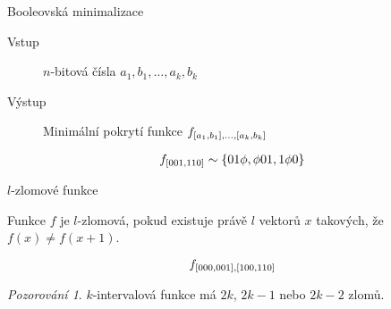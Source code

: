 \documentclass{beamer}
\theoremstyle{remark}
\newtheorem{observation}{Pozorování}
\begin{document}
\begin{frame}{Booleovská minimalizace}

\begin{problem}
\begin{description}
\item[Vstup]
$n$-bitová čísla
$a_1, b_1, \ldots, a_k, b_k$

\item[Výstup]
Minimální pokrytí funkce $f_{[a_1, b_1], \ldots, [a_k, b_k]}$
\end{description}
\end{problem}

\begin{example}
$$
f_{[001, 110]} \sim \{01 \phi, \phi 01, 1 \phi 0\}
$$

\begin{figure}[h]
\centering

\end{figure}
\end{example}
\end{frame}

\begin{frame}{$l$-zlomové funkce}
\begin{definition}
Funkce $f$ je $l$-zlomová,
pokud existuje právě $l$ vektorů $x$ takových,
že $f(x) \neq f(x+1)$.
\end{definition}

\begin{example}
$$f_{[000, 001], [100, 110]}$$

\begin{figure}[h]
\centering

\end{figure}
\end{example}

\begin{observation}
$k$-intervalová funkce má $2k$, $2k-1$ nebo $2k-2$ zlomů.
\end{observation}
\end{frame}
\end{document}

